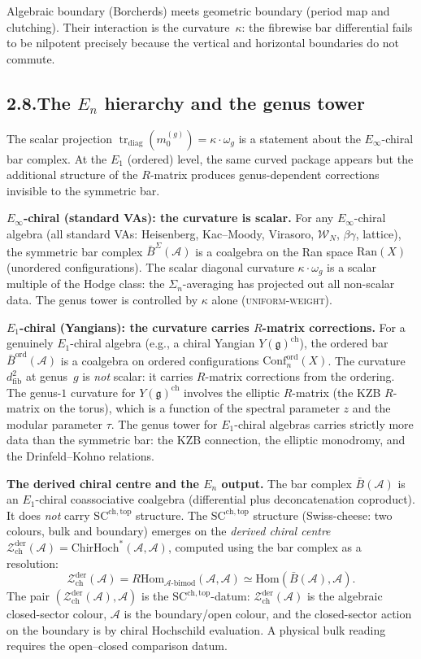 \documentclass[11pt,reqno]{amsart}
\theoremstyle{definition}
\theoremstyle{remark}
\providecommand{\cA}{\mathcal{A}}
\providecommand{\cW}{\mathcal{W}}
\providecommand{\cZ}{\mathcal{Z}}
\providecommand{\barB}{\bar{B}}
\providecommand{\Ran}{\mathrm{Ran}}
\providecommand{\Hom}{\mathrm{Hom}}
\providecommand{\fg}{\mathfrak{g}}
\providecommand{\SCchtop}{\mathrm{SC}^{\mathrm{ch,top}}}
\providecommand{\ChirHoch}{\mathrm{ChirHoch}}
\providecommand{\Conf}{\mathrm{Conf}}
\numberwithin{equation}{section}
\begin{document}
Algebraic boundary (Borcherds) meets geometric boundary (period map
and clutching). Their interaction is the curvature~$\kappa$: the
fibrewise bar differential fails to be nilpotent precisely because
the vertical and horizontal boundaries do not commute.

\subsection*{2.8.\enspace The $E_n$ hierarchy and the genus tower}

The scalar projection
$\operatorname{tr}_{\mathrm{diag}}(m_0^{(g)})=\kappa\cdot\omega_g$
is a statement about the $E_\infty$-chiral bar complex. At the $E_1$
(ordered) level, the same curved package appears but the additional structure of the
$R$-matrix produces genus-dependent corrections invisible to the
symmetric bar.

\medskip
\noindent\textbf{$E_\infty$-chiral (standard VAs): the curvature is
scalar.}\enspace
For any $E_\infty$-chiral algebra (all standard VAs:
Heisenberg, Kac--Moody, Virasoro, $\cW_N$, $\beta\gamma$, lattice),
the symmetric bar complex $\barB^\Sigma(\cA)$ is a coalgebra on
the Ran space $\Ran(X)$ (unordered configurations). The scalar diagonal
curvature $\kappa\cdot\omega_g$ is a scalar multiple of
the Hodge class: the $\Sigma_n$-averaging has projected out all
non-scalar data. The genus tower is controlled by $\kappa$ alone
\textsc{(uniform-weight)}.

\medskip
\noindent\textbf{$E_1$-chiral (Yangians): the curvature carries
$R$-matrix corrections.}\enspace
For a genuinely $E_1$-chiral algebra (e.g., a chiral Yangian
$Y(\fg)^{\mathrm{ch}}$), the ordered bar
$\barB^{\mathrm{ord}}(\cA)$ is a coalgebra on ordered
configurations $\Conf_n^{\mathrm{ord}}(X)$. The curvature
$d_{\mathrm{fib}}^2$ at genus~$g$ is \emph{not} scalar: it
carries $R$-matrix corrections from the ordering. The genus-$1$
curvature for $Y(\fg)^{\mathrm{ch}}$ involves the elliptic
$R$-matrix (the KZB $R$-matrix on the torus), which is a function
of the spectral parameter $z$ and the modular parameter $\tau$.
The genus tower for $E_1$-chiral algebras carries strictly more
data than the symmetric bar: the KZB connection, the elliptic
monodromy, and the Drinfeld--Kohno relations.

\medskip
\noindent\textbf{The derived chiral centre and the $E_n$ output.}\enspace
The bar complex $\barB(\cA)$ is an $E_1$-chiral coassociative
coalgebra (differential plus deconcatenation coproduct). It does
\emph{not} carry $\SCchtop$ structure. The $\SCchtop$ structure
(Swiss-cheese: two colours, bulk and boundary) emerges on the
\emph{derived chiral centre}
$\cZ^{\mathrm{der}}_{\mathrm{ch}}(\cA)=\ChirHoch^*(\cA,\cA)$,
computed using the bar complex as a resolution:
\[
\cZ^{\mathrm{der}}_{\mathrm{ch}}(\cA)=R\Hom_{\cA\text{-bimod}}(\cA,\cA)\simeq\Hom(\barB(\cA),\cA).
\]
The pair $(\cZ^{\mathrm{der}}_{\mathrm{ch}}(\cA),\cA)$ is the
$\SCchtop$-datum: $\cZ^{\mathrm{der}}_{\mathrm{ch}}(\cA)$ is the
algebraic closed-sector colour, $\cA$ is the boundary/open colour, and
the closed-sector action on the boundary is by chiral Hochschild
evaluation. A physical bulk reading requires the open--closed
comparison datum.
\end{document}
